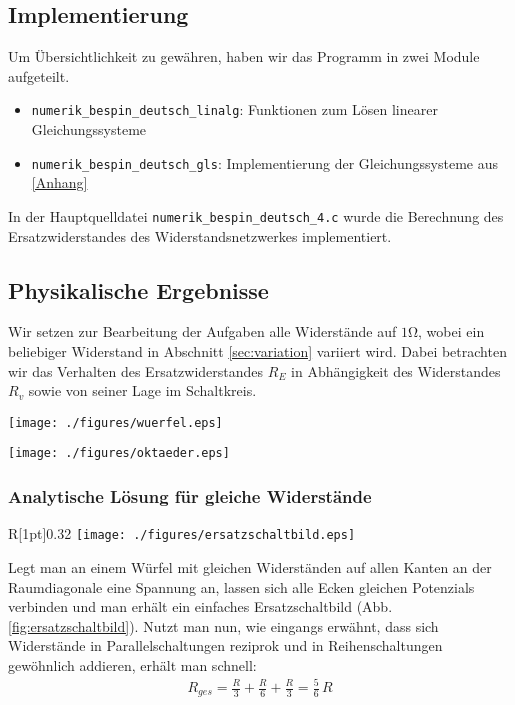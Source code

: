 \documentclass[10pt,a4paper]{article}
\begin{document}
\subsection{Implementierung}
Um Übersichtlichkeit zu gewähren, haben wir das Programm in zwei Module aufgeteilt. 
\begin{itemize}
	\item \texttt{numerik\_bespin\_deutsch\_linalg}: Funktionen zum Lösen linearer Gleichungssysteme
	\item \texttt{numerik\_bespin\_deutsch\_gls}: Implementierung der Gleichungssysteme aus \ref{Anhang}
\end{itemize}
In der Hauptquelldatei \texttt{numerik\_bespin\_deutsch\_4.c} wurde die Berechnung des Ersatzwiderstandes des Widerstandsnetzwerkes implementiert.

\subsection{Physikalische Ergebnisse}

Wir setzen zur Bearbeitung der Aufgaben alle Widerstände auf $\num{1}\si{\ohm}$, wobei ein beliebiger Widerstand in Abschnitt \ref{sec:variation} variiert wird. Dabei betrachten wir das Verhalten des Ersatzwiderstandes $R_E$ in Abhängigkeit des Widerstandes $R_v$ sowie von seiner Lage im Schaltkreis.

\vspace{8pt}
\begin{minipage}[c]{0.47\textwidth}
\centering
\texttt{[image: ./figures/wuerfel.eps]}
\vspace{10pt}
\end{minipage}
\begin{minipage}[c]{0.47\textwidth}
\centering
\texttt{[image: ./figures/oktaeder.eps]}
\end{minipage}

\subsubsection{Analytische Lösung für gleiche Widerstände}
\label{auswertung}
\begin{wrapfigure}[15]{R}[1pt]{0.32\textwidth}
\centering
\texttt{[image: ./figures/ersatzschaltbild.eps]}
\caption{Ersatzschaltung für gleiche Widerstände $R$}
\label{fig:ersatzschaltbild}
\end{wrapfigure}
Legt man an einem Würfel mit gleichen Widerständen auf allen Kanten an der Raumdiagonale eine Spannung an, lassen sich alle Ecken gleichen Potenzials verbinden und man erhält ein einfaches Ersatzschaltbild (Abb. \ref{fig:ersatzschaltbild}). Nutzt man nun, wie eingangs erwähnt, dass sich Widerstände in Parallelschaltungen reziprok und in Reihenschaltungen gewöhnlich addieren, erhält man schnell:
\begin{align}
R_{ges}=\frac{R}{3}+\frac{R}{6}+\frac{R}{3}=\frac{5}{6}\,R
\end{align}
\end{document}
